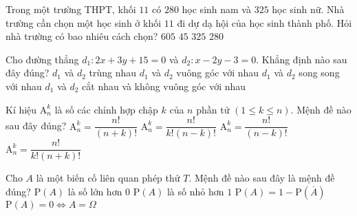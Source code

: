 \begin{ex}%
	Trong một trường THPT, khối $11$ có $280$ học sinh nam và $325$ học sinh nữ. Nhà trường cần chọn một học sinh ở khối $11$ đi dự dạ hội của học sinh thành phố. Hỏi nhà trường có bao nhiêu cách chọn?
	\choice
	{\True $605$}
	{$45$}
	{$325$}
	{$280$}
\end{ex}

\begin{ex}%
	Cho đường thẳng $d_1\colon 2x+3y+15=0$ và $d_2\colon x-2y-3=0$. Khẳng định nào sau đây đúng?
	\choice
	{$d_1$ và $d_2$ trùng nhau}
	{$d_1$ và $d_2$ vuông góc với nhau}
	{$d_1$ và $d_2$ song song với nhau}
	{\True $d_1$ và $d_2$ cắt nhau và không vuông góc với nhau}
\end{ex}

\begin{ex}%
	Kí hiệu $\mathrm{A}_n^k$ là số các chỉnh hợp chập $k$ của $n$ phần tử $(1 \leq k \leq n)$. Mệnh đề nào sau đây đúng?
	\choice
	{$\mathrm{A}_n^k=\dfrac{n!}{(n+k)!}$}
	{$\mathrm{A}_n^k=\dfrac{n!}{k!(n-k)!}$}
	{\True $\mathrm{A}_n^k=\dfrac{n!}{(n-k)!}$}
	{$\mathrm{A}_n^k=\dfrac{n!}{k!(n+k)!}$}
\end{ex}

\begin{ex}%
	Cho $A$ là một biến cố liên quan phép thử $T$. Mệnh đề nào sau đây là mệnh đề đúng?
	\choice
	{$\mathrm{P}(A)$ là số lớn hơn $0$}
	{$\mathrm{P}(A)$ là số nhỏ hơn $1$}
	{\True $\mathrm{P}(A)=1-\mathrm{P}\left(\overline{A}\right)$}
	{$\mathrm{P}(A)=0 \Leftrightarrow A=\Omega$}
\end{ex}

